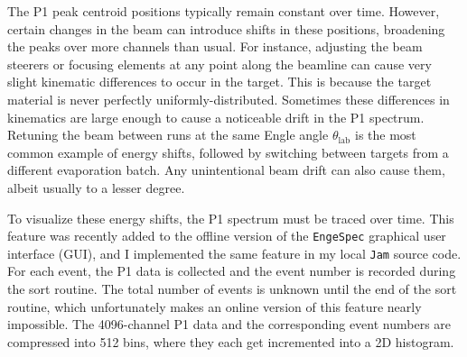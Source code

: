 
The P1 peak centroid positions typically remain constant over time. However, certain changes in the beam can introduce shifts in these positions, broadening the peaks over more channels than usual. For instance, adjusting the beam steerers or focusing elements at any point along the beamline can cause very slight kinematic differences to occur in the target. This is because the target material is never perfectly uniformly-distributed. Sometimes these differences in kinematics are large enough to cause a noticeable drift in the P1 spectrum. Retuning the beam between runs at the same Engle angle $\theta_{\mathrm{lab}}$ is the most common example of energy shifts, followed by switching between targets from a different evaporation batch. Any unintentional beam drift can also cause them, albeit usually to a lesser degree.

To visualize these energy shifts, the P1 spectrum must be traced over time. This feature was recently added to the offline version of the \texttt{EngeSpec} \cite{EngeSpec} graphical user interface (GUI), and I implemented the same feature in my local \texttt{Jam} source code. For each event, the P1 data is collected and the event number is recorded during the sort routine. The total number of events is unknown until the end of the sort routine, which unfortunately makes an online version of this feature nearly impossible. The 4096-channel P1 data and the corresponding event numbers are compressed into 512 bins, where they each get incremented into a 2D histogram.

\def\yTS{0.635} %
\def\xTS{2.48} %

